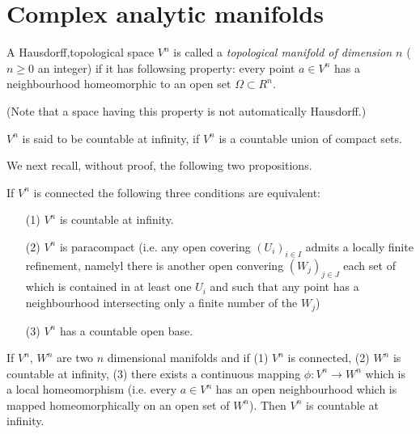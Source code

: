 
\chapter{Complex analytic manifolds}\label{chap3}

\begin{defi*}
A Hausdorff,\pageoriginale topological space $V^n$ is called a
\textit{topological manifold of dimension $n$} ($n \geq 0$ an integer)
if it has followsing property: every point $a \in V^n$ has a
neighbourhood homeomorphic to an open set $\Omega \subset R^n$.
\end{defi*}

(Note that a space having this property is not automatically
Hausdorff.)

$V^n$ is said to be countable at infinity, if $V^n$ is a countable
union of compact sets.

We next recall, without proof, the following two propositions.

\setcounter{proposition}{0}
\begin{proposition}\label{chap3:prop1}
If $V^n$ is connected the following three conditions are equivalent:
\begin{itemize}
\item[(1)] $V^n$ is countable at infinity.

\item[(2)] $V^n$ is paracompact (i.e. any open covering $(U_i)_{i\in
  I}$ admits a locally finite refinement, namelyl there is another
  open convering $(W_j)_{j\in J}$ each set of which is contained in at
  least one $U_i$ and such that any point has a neighbourhood
  intersecting only a finite number of the $W_j$)

\item[(3)] $V^n$ has a countable open base.
\end{itemize}
\end{proposition}

\begin{proposition}\label{chap3:prop2}
If $V^n$, $W^n$ are two $n$ dimensional manifolds and if (1) $V^n$ is
connected, (2) $W^n$ is countable at infinity, (3) there exists a
continuous mapping $\phi: V^n \to W^n$ which is a local homeomorphism
(i.e. every $a \in V^n$ has an open neighbourhood which is mapped
homeomorphically on an open set of $W^n$). Then $V^n$ is\pageoriginale
countable at infinity.
\end{proposition}

